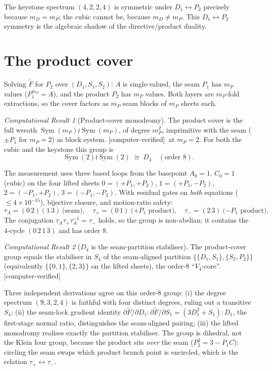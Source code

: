 \documentclass[11pt]{article}
\theoremstyle{plain}
\theoremstyle{definition}
\theoremstyle{remark}
\newtheorem{result}{Computational Result}
\newcommand{\Measured}{\textsf{[computer-verified]}}
\newcommand{\Sym}{\operatorname{Sym}}
\newcommand{\Ftil}{\widetilde{F}}
\begin{document}
\noindent The keystone spectrum $(4,2,2,4)$ is symmetric under $D_1\leftrightarrow
P_2$ precisely because $m_D=m_P$; the cubic cannot be, because $m_D\neq m_P$. This
$D_1\leftrightarrow P_2$ symmetry is the algebraic shadow of the directive/product
duality.

\section{The product cover}
\label{sec:product}

Solving $\Ftil$ for $P_2$ over $(D_1,S_1,S_2)$: $A$ is single-valued, the seam
$P_1$ has $m_P$ values ($P_1^{m_P}=A$), and the product $P_2$ has $m_P$ values.
Both layers are $m_P$-fold extractions, so the cover factors as $m_P$ seam blocks
of $m_P$ sheets each.

\begin{result}[Product-cover monodromy]
\label{res:product}
The product cover is the full wreath $\Sym(m_P)\wr\Sym(m_P)$, of degree $m_P^2$,
imprimitive with the seam ($\pm P_1$ for $m_P=2$) as block system. \Measured\ at
$m_P=2$. For both the cubic and the keystone this group is
\[
  \Sym(2)\wr\Sym(2) \;\cong\; D_4 \quad(\text{order } 8).
\]
\end{result}

\noindent The measurement uses three based loops from the basepoint $A_0=1$,
$C_0=1$ (cubic) on the four lifted sheets
$0{=}({+}P_1,{+}P_2)$, $1{=}({+}P_1,{-}P_2)$, $2{=}({-}P_1,{+}P_2)$,
$3{=}({-}P_1,{-}P_2)$. With residual gates on \emph{both} equations
($\le 4\times10^{-15}$), bijective closure, and motion-ratio safety:
\[
  \tau_A=(0\,2)(1\,3)\ \text{(seam)},\quad
  \tau_+=(0\,1)\ \text{($+P_1$ product)},\quad
  \tau_-=(2\,3)\ \text{($-P_1$ product)}.
\]
The conjugation $\tau_A\tau_+\tau_A^{-1}=\tau_-$ holds, so the group is
non-abelian; it contains the $4$-cycle $(0\,2\,1\,3)$ and has order $8$.

\begin{result}[$D_4$ is the seam-partition stabiliser]
\label{res:stab}
The product-cover group equals the stabiliser in $S_4$ of the seam-aligned
partition $\{\{D_1,S_1\},\{S_2,P_2\}\}$ (equivalently $\{\{0,1\},\{2,3\}\}$ on the
lifted sheets), the order-$8$ ``$V_4$-core''. \Measured
\end{result}

\noindent Three independent derivations agree on this order-$8$ group: (i) the
degree spectrum $(9,3,2,4)$ is faithful with four distinct degrees, ruling out a
transitive $S_4$; (ii) the seam-lock gradient identity
$\partial\Ftil/\partial D_1 : \partial\Ftil/\partial S_1 = (3D_1^2+S_1):D_1$, the
first-stage normal ratio, distinguishes the seam-aligned pairing; (iii) the lifted
monodromy realises exactly the partition stabiliser. The group is dihedral, not
the Klein four group, because the product sits \emph{over} the seam
($P_2^2 = 3-P_1 C$): circling the seam swaps which product branch point is
encircled, which is the relation $\tau_+\leftrightarrow\tau_-$.
\end{document}
